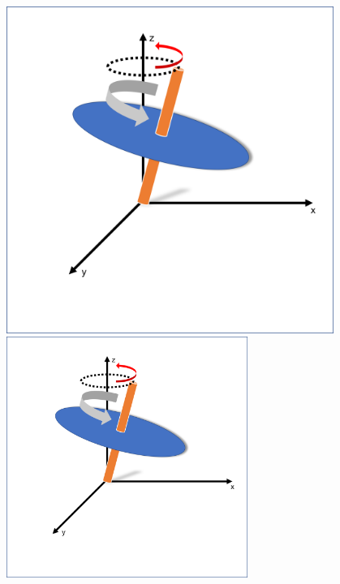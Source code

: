 \documentclass[10pt]{beamer}
\begin{document}
\begin{frame}


\end{frame}

\begin{figure}[h]
	\begin{minipage}{0.6\textwidth}
		\centering
		\includegraphics[width=0.95\textwidth]{sphere1.png}
	\end{minipage}

	\begin{minipage}{0.6\textwidth}
		\centering
		\includegraphics[width=0.70\textwidth]{sphere1.png}
	\end{minipage}
\end{figure}
\end{document}
